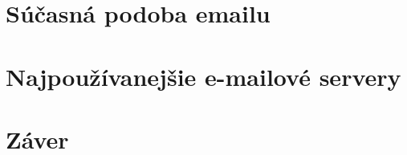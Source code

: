 \documentclass[10pt,slovak,twoside,a4paper]{article}
\begin{document}
\section{Súčasná podoba emailu} 

\section{Najpoužívanejšie e-mailové servery} 

\section{Záver} \label{zaver} %






\end{document}
